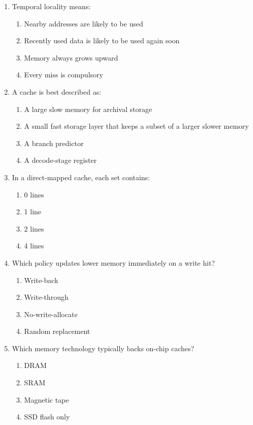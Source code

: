 \documentclass[11pt]{article}
\begin{document}
\begin{enumerate}[label=\textbf{A\arabic*.}]
  \item Temporal locality means:
  \begin{enumerate}[label=(\Alph*)]
    \item Nearby addresses are likely to be used
    \item Recently used data is likely to be used again soon
    \item Memory always grows upward
    \item Every miss is compulsory
  \end{enumerate}

  \item A cache is best described as:
  \begin{enumerate}[label=(\Alph*)]
    \item A large slow memory for archival storage
    \item A small fast storage layer that keeps a subset of a larger slower memory
    \item A branch predictor
    \item A decode-stage register
  \end{enumerate}

  \item In a direct-mapped cache, each set contains:
  \begin{enumerate}[label=(\Alph*)]
    \item 0 lines
    \item 1 line
    \item 2 lines
    \item 4 lines
  \end{enumerate}

  \item Which policy updates lower memory immediately on a write hit?
  \begin{enumerate}[label=(\Alph*)]
    \item Write-back
    \item Write-through
    \item No-write-allocate
    \item Random replacement
  \end{enumerate}

  \item Which memory technology typically backs on-chip caches?
  \begin{enumerate}[label=(\Alph*)]
    \item DRAM
    \item SRAM
    \item Magnetic tape
    \item SSD flash only
  \end{enumerate}


\end{enumerate}
\end{document}

